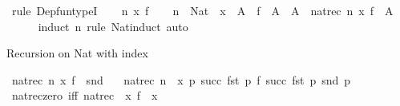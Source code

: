 \begin{isabellebody}
%
\isadelimproof
%
\endisadelimproof
%
\isatagproof
{}\isamarkupfalse%
\ {\isacharparenleft}{\kern0pt}rule\ Dep{\isacharunderscore}{\kern0pt}fun{\isacharunderscore}{\kern0pt}typeI{\isacharparenright}{\kern0pt}{\isacharplus}{\kern0pt}\isanewline
\ \ \isamarkupfalse%
\ n\ x\ f\isanewline
\ \ \isamarkupfalse%
\ {\isachardoublequoteopen}n\ {\isacharcolon}{\kern0pt}\ Nat\ {\isasymLongrightarrow}\ x\ {\isacharcolon}{\kern0pt}\ A\ {\isasymLongrightarrow}\ f\ {\isacharcolon}{\kern0pt}\ A\ {\isasymRightarrow}\ A\ {\isasymLongrightarrow}\ nat{\isacharunderscore}{\kern0pt}rec\ n\ x\ f\ {\isacharcolon}{\kern0pt}\ A{\isachardoublequoteclose}\isanewline
\ \ \ \ \isamarkupfalse%
\ {\isacharparenleft}{\kern0pt}induct\ n\ rule{\isacharcolon}{\kern0pt}\ Nat{\isacharunderscore}{\kern0pt}induct{\isacharparenright}{\kern0pt}\ auto\isanewline
{}\isamarkupfalse%
%
\endisatagproof
{\isafoldproof}%
%
\isadelimproof
%
\endisadelimproof
%
\begin{isamarkuptext}%
Recursion on Nat with index%
\end{isamarkuptext}\isamarkuptrue%
\isamarkupfalse%
\ {\isachardoublequoteopen}nat{\isacharunderscore}{\kern0pt}rec{\isacharprime}{\kern0pt}\ n\ x\ f\ {\isasymequiv}\ snd\ {\isacharparenleft}{\kern0pt}\isanewline
\ \ nat{\isacharunderscore}{\kern0pt}rec\ n\ {\isasymlangle}{}{\isacharcomma}{\kern0pt}\ x\ {\isacharparenleft}{\kern0pt}{\isasymlambda}p{\isachardot}{\kern0pt}\ {\isasymlangle}succ\ {\isacharparenleft}{\kern0pt}fst\ p{\isacharparenright}{\kern0pt}{\isacharcomma}{\kern0pt}\ f\ {\isacharparenleft}{\kern0pt}succ\ {\isacharparenleft}{\kern0pt}fst\ p{\isacharparenright}{\kern0pt}{\isacharparenright}{\kern0pt}\ {\isacharparenleft}{\kern0pt}snd\ p{\isacharparenright}{\kern0pt}{\isasymrangle}{\isacharparenright}{\kern0pt}\isanewline
{\isacharparenright}{\kern0pt}{\isachardoublequoteclose}\isanewline
\isanewline
{}\isamarkupfalse%
\ nat{\isacharunderscore}{\kern0pt}rec{\isacharprime}{\kern0pt}{\isacharunderscore}{\kern0pt}zero\ {\isacharbrackleft}{\kern0pt}iff{\isacharbrackright}{\kern0pt}{\isacharcolon}{\kern0pt}\ {\isachardoublequoteopen}nat{\isacharunderscore}{\kern0pt}rec{\isacharprime}{\kern0pt}\ {}\ x\ f\ {\isacharequal}{\kern0pt}\ x\isanewline
%
\isadelimproof
\ \ %
\endisadelimproof
%
\isatagproof
{}\isamarkupfalse%

\end{isabellebody}
